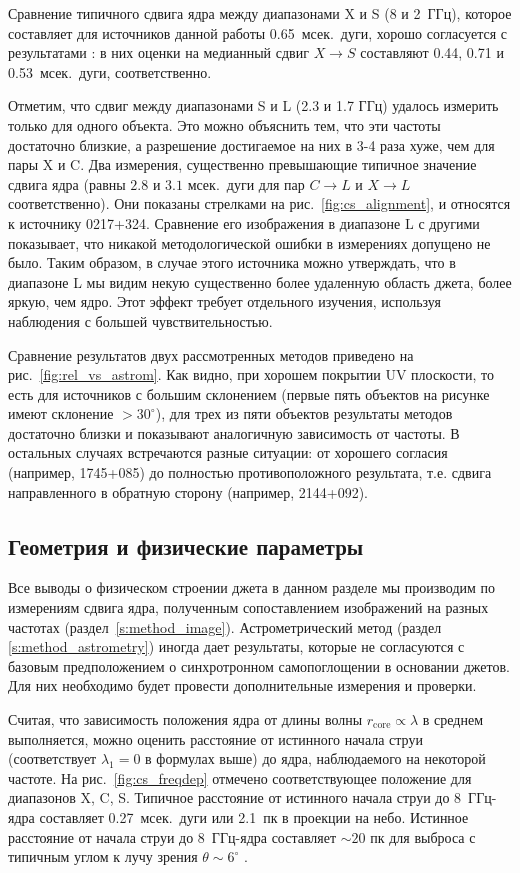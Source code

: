 Сравнение типичного сдвига ядра между диапазонами X и S (8 и 2~ГГц), которое составляет для
источников данной работы 0.65~мсек.~дуги, хорошо согласуется с результатами
\cite{Kovalev_2008,Sokolovsky_2011,Plavin2018}: в них оценки на медианный
сдвиг $X\to S$ составляют 0.44, 0.71 и 0.53~мсек.~дуги, соответственно.

Отметим, что сдвиг между диапазонами S и L (2.3 и 1.7 ГГц) удалось измерить только для одного
объекта. Это можно объяснить тем, что эти частоты достаточно близкие, а разрешение достигаемое на
них в 3-4 раза хуже, чем для пары X и C. Два измерения, существенно превышающие типичное значение
сдвига ядра (равны $2.8$ и $3.1$ мсек.~дуги для пар $C\to L$ и $X\to L$ соответственно). Они
показаны стрелками на рис.~\ref{fig:cs_alignment}, и относятся к источнику 0217+324. Сравнение его
изображения в диапазоне L с другими показывает, что никакой методологической ошибки в измерениях
допущено не было. Таким образом, в случае этого источника можно утверждать, что в диапазоне L мы
видим некую существенно более удаленную область джета, более яркую, чем ядро. Этот эффект требует
отдельного изучения, используя наблюдения с большей чувствительностью.

Сравнение результатов двух рассмотренных методов приведено на рис.~\ref{fig:rel_vs_astrom}. Как
видно, при хорошем покрытии UV плоскости, то есть для источников с большим склонением (первые пять
объектов на рисунке имеют склонение $> 30^\circ$), для трех из пяти объектов результаты методов
достаточно близки и показывают аналогичную зависимость от частоты. В остальных случаях встречаются
разные ситуации: от хорошего согласия (например, 1745+085) до полностью противоположного
результата, т.е. сдвига направленного в обратную сторону (например, 2144+092).

\subsection{Геометрия и физические параметры}
\label{s:res_phys}

Все выводы о физическом строении джета в данном разделе мы производим по измерениям сдвига ядра,
полученным сопоставлением изображений на разных частотах (раздел~\ref{s:method_image}).
Астрометрический метод (раздел \ref{s:method_astrometry}) иногда дает результаты, которые не
согласуются с базовым предположением о синхротронном самопоглощении в основании джетов.
Для них необходимо будет провести дополнительные измерения и проверки.

Считая, что зависимость положения ядра от длины волны $r_\mathrm{core} \propto \lambda$ в среднем
выполняется, можно оценить расстояние от истинного начала струи (соответствует $\lambda_1 = 0$ в
формулах выше) до ядра, наблюдаемого на некоторой частоте. На рис.~\ref{fig:cs_freqdep} отмечено
соответствующее положение для диапазонов X, C, S. Типичное расстояние от истинного начала
струи до 8~ГГц-ядра составляет 0.27~мсек.~дуги или 2.1~пк в проекции на небо. Истинное расстояние
от начала струи до 8~ГГц-ядра составляет $\sim 20$ пк для выброса с типичным углом к лучу зрения
$\theta \sim 6^\circ$ \cite{Hovatta2009}.

